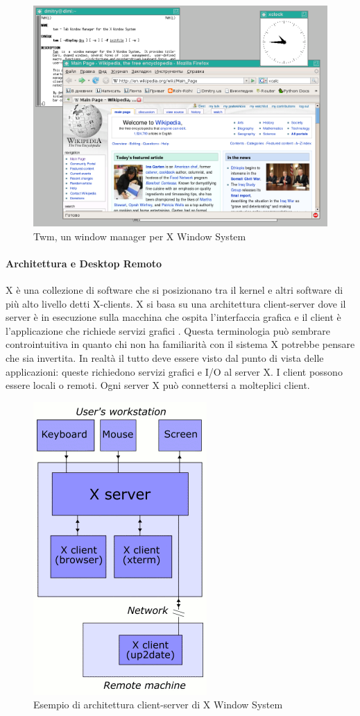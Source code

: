 \documentclass[12pt,a4paper,openright,twoside]{book}
\begin{document}
\begin{figure}
    \centering
    \includegraphics[width=.5\linewidth]{figures/Twm.png}
    \caption[xarch]{Twm, un window manager per X Window System \footnotemark}
\end{figure}

\paragraph{Architettura e Desktop Remoto}

X è una collezione di software che si posizionano tra il kernel e altri software di più alto livello detti X-clients.
X si basa su una architettura client-server dove il server è in esecuzione sulla macchina che ospita l'interfaccia grafica e il client è l'applicazione che richiede servizi grafici \cite{Scheifler1986}.
%
Questa terminologia può sembrare controintuitiva in quanto chi non ha familiarità con il sistema X potrebbe pensare che sia invertita.
In realtà il tutto deve essere visto dal punto di vista delle applicazioni: queste richiedono servizi grafici e I/O al server X.
I client possono essere locali o remoti. Ogni server X può connettersi a molteplici client.
\begin{figure}
    \centering
    \includegraphics[width=.3\linewidth]{figures/X_client_server_example.png}
    \caption[xarch]{Esempio di architettura client-server di X Window System \footnotemark}
\end{figure}
\end{document}

